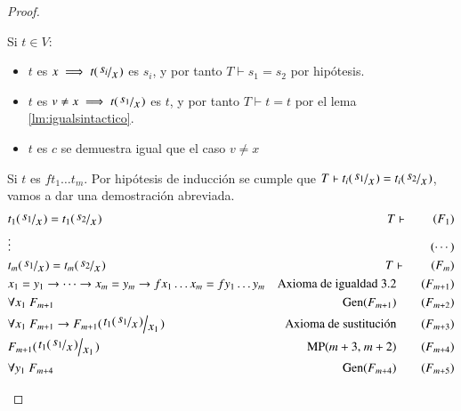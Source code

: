 \begin{proof}
\begin{enumerate}[(a)]
            Si $t\in V$:\\
                \begin{itemize}
                    \item $t$ es $x \implies t(\quo{s_i}{x})$ es $s_i$, y por tanto $T \vdash s_1 = s_2$ por hipótesis.
                    \item $t$ es $v \neq x \implies t(\quo{s_1}{x})$ es $t$, y por tanto $T \vdash t = t$ por el lema \ref{lm:igualsintactico}.
                    \item $t$ es $c$ se demuestra igual que el caso $v \neq x$
                \end{itemize}
            Si $t$ es $f t_1 \ldots t_m$. Por hipótesis de inducción se cumple que $T \vdash t_i(\quo{s_1}{x}) = t_i(\quo{s_2}{x})$, vamos a dar una demostración abreviada.\\
            \begin{align*}
                & t_1(\quo{s_1}{x}) = t_1(\quo{s_2}{x})                                                                                  &\ T\vdash \tag{$F_1$}\\
                & \vdots                                                                                                                 & \tag{$\cdots$}\\
                & t_m(\quo{s_1}{x}) = t_m(\quo{s_2}{x})                                                                                  &\ T\vdash  \tag{$F_m$}\\
                & x_1 = y_1 \then \cdots \then x_m = y_m \then f x_1 \ldots x_m = f y_1 \ldots y_m                                       & \text{Axioma de igualdad 3.2} \tag{$F_{m+1}$}\\
                & \forall x_1\ F_{m+1}                                                                                                   & \text{Gen($F_{m+1}$)} \tag{$F_{m+2}$}\\
                & \forall x_1\ F_{m+1} \then F_{m+1}(\quo{t_1(\quo{s_1}{x})}{x_1})                                                       & \text{Axioma de sustitución} \tag{$F_{m+3}$}\\
                & F_{m+1}(\quo{t_1(\quo{s_1}{x})}{x_1})                                                                                  & \text{MP($m+3$, $m+2$)}\tag{$F_{m+4}$}\\
                & \forall y_1\ F_{m+4}                                                                                                   & \text{Gen($F_{m+4}$)} \tag{$F_{m+5}$}\\

\end{align*}
\end{enumerate}
\end{proof}
